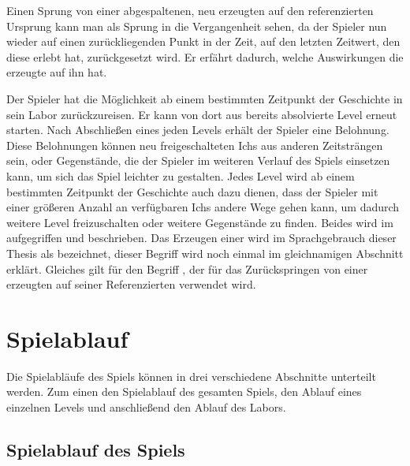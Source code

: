 Einen Sprung von einer abgespaltenen, neu erzeugten  auf den referenzierten Ursprung kann man als Sprung in die Vergangenheit sehen, da der Spieler nun wieder auf einen zurückliegenden Punkt in der Zeit, auf den letzten Zeitwert, den diese  erlebt hat, zurückgesetzt wird. Er erfährt dadurch, welche Auswirkungen die erzeugte  auf ihn hat.

Der Spieler hat die Möglichkeit ab einem bestimmten Zeitpunkt der Geschichte in sein Labor zurückzureisen. Er kann von dort aus bereits absolvierte Level erneut starten. Nach Abschließen eines jeden Levels erhält der Spieler eine Belohnung. Diese Belohnungen können neu freigeschalteten Ichs aus anderen Zeitsträngen sein, oder Gegenstände, die der Spieler im weiteren Verlauf des Spiels einsetzen kann, um sich das Spiel leichter zu gestalten. Jedes Level wird ab einem bestimmten Zeitpunkt der Geschichte auch dazu dienen, dass der Spieler mit einer größeren Anzahl an verfügbaren Ichs andere Wege gehen kann, um dadurch weitere Level freizuschalten oder weitere Gegenstände zu finden. Beides wird im  aufgegriffen und beschrieben.
Das Erzeugen einer  wird im Sprachgebrauch dieser Thesis als  bezeichnet, dieser Begriff wird noch einmal im gleichnamigen Abschnitt erklärt. Gleiches gilt für den Begriff , der für das Zurückspringen von einer erzeugten  auf seiner Referenzierten  verwendet wird.

\section{Spielablauf}
Die Spielabläufe des Spiels können in drei verschiedene Abschnitte unterteilt werden. Zum einen den Spielablauf des gesamten Spiels, den Ablauf eines einzelnen Levels und anschließend den Ablauf des Labors.

\subsection{Spielablauf des Spiels}

